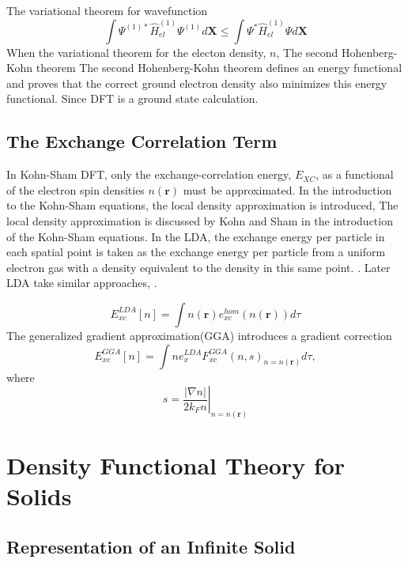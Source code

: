 The variational theorem for wavefunction
\begin{equation}
	\int \Psi^{(1)*}\hat{H}_{el}^{(1)}\Psi^{(1)} d\bm{X} \leq \int \Psi^*\hat{H}_{el}^{(1)} \Psi d\bm{X}
\end{equation}
When the variational theorem for the electon density, $n$,
The second Hohenberg-Kohn theorem 
The second Hohenberg-Kohn theorem defines an energy functional and proves that the correct ground electron density also minimizes this energy functional.  Since DFT is a ground state calculation.


\subsection{The Exchange Correlation Term}

In Kohn-Sham DFT, only the exchange-correlation energy, $E_{XC}$, as a functional of the electron spin densities $n(\bm{r})$ must be approximated.
In the introduction to the Kohn-Sham equations\cite{kohn1965_dft}, the local density approximation is introduced,
The local density approximation is discussed by Kohn and Sham\cite{kohn1965_dft} in the introduction of the Kohn-Sham equations.  
In the LDA, the exchange energy per particle in each spatial point is taken as the exchange energy per particle from a uniform electron gas with a density equivalent to the density in this same point. \cite{ceperley1980_lda}.  
Later LDA take similar approaches, \cite{vosko1980_lda_vwm, perdew1981_lda_pz, perdew1992_lda_pw}.


\begin{equation}
	E_{xc}^{LDA}[n]=\int n(\bm{r})e_{xc}^{hom}(n(\bm{r}))d\tau
\end{equation}
The generalized gradient approximation(GGA)\cite{langreth1983_gga_1,becke1988_gga_2} introduces a gradient correction 
\begin{equation}
	E_{xc}^{GGA}[n]=\int n e_x^{LDA} F_{xc}^{GGA}(n,s)_{n=n(\bm{r})}d\tau,
\end{equation}
where
\begin{equation}
	s =\left.
	       \frac{\lvert\nabla n\rvert}{2k_F n}
	   \right\rvert_{n=n(\bm{r})}
\end{equation}

\section{Density Functional Theory for Solids}
\subsection{Representation of an Infinite Solid}

